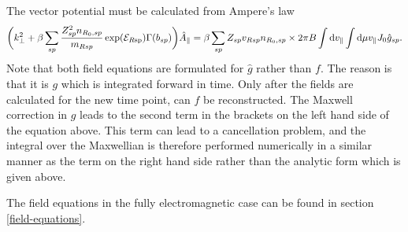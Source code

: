 The vector potential must be calculated from Ampere's law 
\begin{align}
\label{Ampere}
\biggl ( k_{\perp}^2 + \beta \sum_{sp} {Z_{sp}^2 n_{R_0,sp} \over m_{Rsp}}\exp(\mathcal{E}_{R{\rm sp}})  \Gamma(b_{sp}) \biggr ) \hat A_{\parallel}
= \beta \sum_{sp} Z_{sp} v_{Rsp} n_{R_0,sp} \times 2 \pi B \int {\rm d} v_{\parallel} \int {\rm d} \mu v_{\parallel} J_0 \hat g_{sp}.
\end{align}
Note that both field equations are formulated for $\hat g$ rather than $f$. The reason is that it is $g$ which is integrated 
forward in time. Only after the fields are calculated for the new time point, can $f$ be reconstructed. 
The Maxwell correction in $g$ leads to the second term in the brackets on the left hand side of the equation above. 
This term can lead to a cancellation problem, and the integral over the Maxwellian is therefore performed numerically 
in a similar manner as the term on the right hand side \cite{CAN03} rather than the analytic form which is given above. 

The field equations in the fully electromagnetic case can be found in section \ref{field-equations}.

